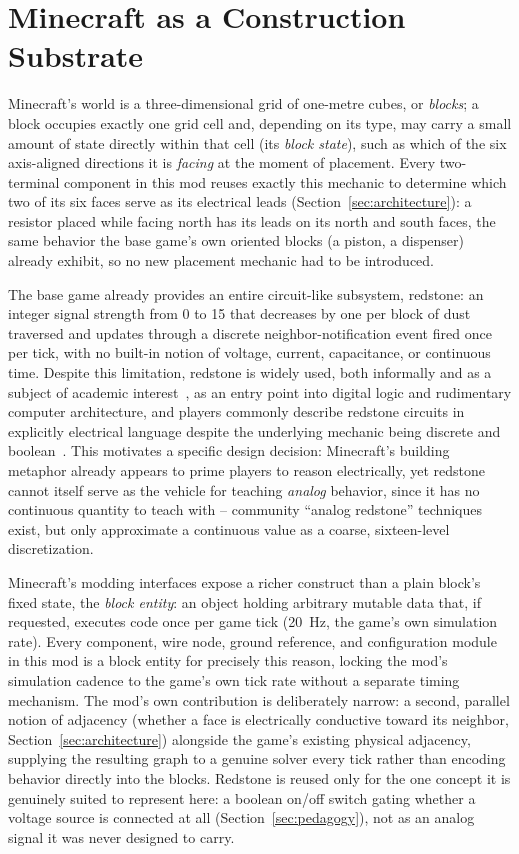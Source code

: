\section{Minecraft as a Construction Substrate}
\label{sec:minecraft-mechanics}

Minecraft's world is a three-dimensional grid of one-metre cubes, or \emph{blocks}; a block
occupies exactly one grid cell and, depending on its type, may carry a small amount of state
directly within that cell (its \emph{block state}), such as which of the six axis-aligned
directions it is \emph{facing} at the moment of placement. Every two-terminal component in
this mod reuses exactly this mechanic to determine which two of its six faces serve as its
electrical leads (Section~\ref{sec:architecture}): a resistor placed while facing north has
its leads on its north and south faces, the same behavior the base game's own oriented blocks
(a piston, a dispenser) already exhibit, so no new placement mechanic had to be introduced.

The base game already provides an entire circuit-like subsystem, redstone: an integer signal
strength from 0 to 15 that decreases by one per block of dust traversed and updates through a
discrete neighbor-notification event fired once per tick, with no built-in notion of voltage,
current, capacitance, or continuous time. Despite this limitation, redstone is widely used,
both informally and as a subject of academic interest~\cite{nebel2016mining}, as an entry
point into digital logic and rudimentary computer architecture, and players commonly describe
redstone circuits in explicitly electrical language despite the underlying mechanic being
discrete and boolean~\cite{dezuanni2015redstone}. This motivates a specific design decision:
Minecraft's building metaphor already appears to prime players to reason electrically, yet
redstone cannot itself serve as the vehicle for teaching \emph{analog} behavior, since it has
no continuous quantity to teach with -- community ``analog redstone'' techniques exist, but
only approximate a continuous value as a coarse, sixteen-level discretization.

Minecraft's modding interfaces expose a richer construct than a plain block's fixed state,
the \emph{block entity}: an object holding arbitrary mutable data that, if requested, executes
code once per game tick (20~Hz, the game's own simulation rate). Every component, wire node,
ground reference, and configuration module in this mod is a block entity for precisely this
reason, locking the mod's simulation cadence to the game's own tick rate without a separate
timing mechanism. The mod's own contribution is deliberately narrow: a second, parallel
notion of adjacency (whether a face is electrically conductive toward its neighbor,
Section~\ref{sec:architecture}) alongside the game's existing physical adjacency, supplying
the resulting graph to a genuine solver every tick rather than encoding behavior directly
into the blocks. Redstone is reused only for the one concept it is genuinely suited to
represent here: a boolean on/off switch gating whether a voltage source is connected at all
(Section~\ref{sec:pedagogy}), not as an analog signal it was never designed to carry.
